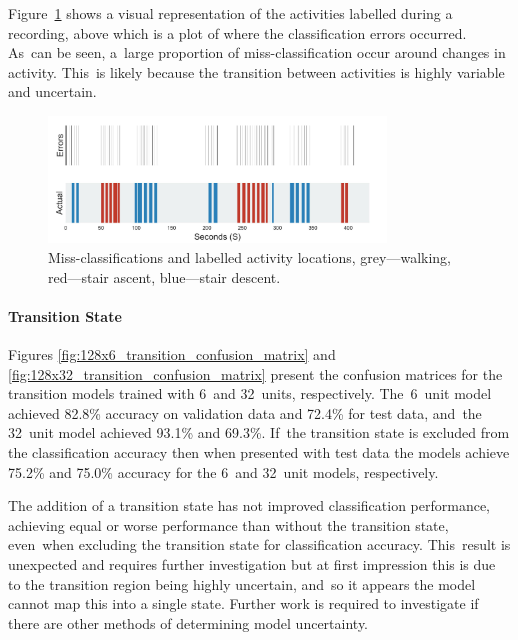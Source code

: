 Figure~\ref{fig:missclassification} shows a visual representation of the activities labelled during a recording, above which is a plot of where the classification errors occurred. As~can be seen, a~large proportion of miss-classification occur around changes in activity. This~is likely because the transition between activities is highly variable and uncertain.

\begin{figure}[!hbt]
    \centering
    \includegraphics[width=0.8\textwidth]{content/4-LSTM_Behaviour/results/location_of_errors.jpg}
    \caption[Miss-classifications and labelled activity locations]{Miss-classifications and labelled activity locations, grey---walking, red---stair ascent, blue---stair descent.}
    \label{fig:missclassification}
\end{figure}


\paragraph{Transition State}
Figures \ref{fig:128x6_transition_confusion_matrix} and \ref{fig:128x32_transition_confusion_matrix} present the confusion matrices for the transition models trained with 6~and 32~units, respectively. The~6~unit model achieved 82.8\% accuracy on validation data and 72.4\% for test data, and~the 32~unit model achieved 93.1\% and 69.3\%. If~the transition state is excluded from the classification accuracy then when presented with test data the models achieve 75.2\% and 75.0\% accuracy for the 6~and 32~unit models, respectively.%

The addition of a transition state has not improved classification performance, achieving equal or worse performance than without the transition state, even~when excluding the transition state for classification accuracy. This~result is unexpected and requires further investigation but at first impression this is due to the transition region being highly uncertain, and~so it appears the model cannot map this into a single state. Further work is required to investigate if there are other methods of determining model uncertainty.

